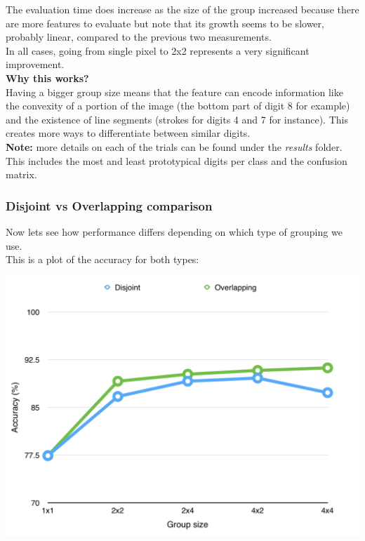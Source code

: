 \documentclass[11pt]{article}
\begin{document}
The evaluation time does increase as the size of the group increased because there are more features to evaluate but note that its growth seems to be slower, probably linear, compared to the previous two measurements.\\

In all cases, going from single pixel to 2x2 represents a very significant improvement.\\

\textbf{Why this works?}\\
Having a bigger group size means that the feature can encode information like the convexity of a portion of the image (the bottom part of digit 8 for example) and the existence of line segments (strokes for digits 4 and 7 for instance). This creates more ways to differentiate between similar digits.\\

\textbf{Note:} more details on each of the trials can be found under the \textit{results} folder. This includes the most and least prototypical digits per class and the confusion matrix.

\subsubsection*{Disjoint vs Overlapping comparison}
Now lets see how performance differs depending on which type of grouping we use.\\

This is a plot of the accuracy for both types:
\begin{center}
\includegraphics[scale=0.8]{part1/2/comparison_accuracy.png}
\end{center}
\end{document}
